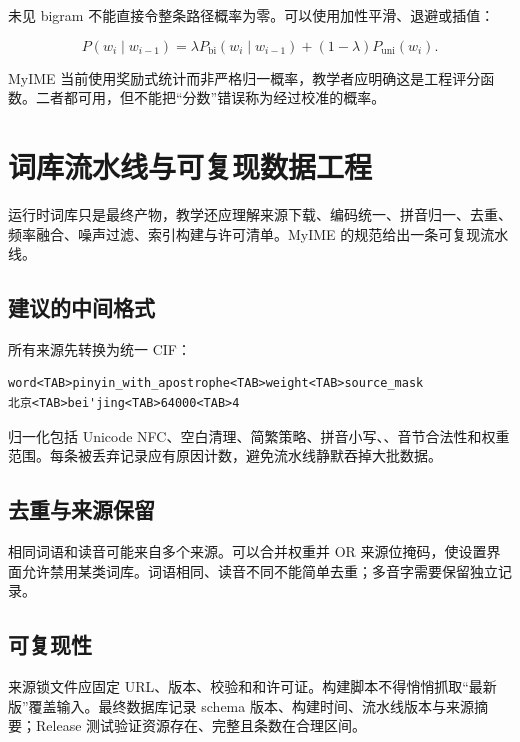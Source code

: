 未见 bigram 不能直接令整条路径概率为零。可以使用加性平滑、退避或插值：

\[
P(w_i\mid w_{i-1})=\lambda P_{\mathrm{bi}}(w_i\mid w_{i-1})+(1-\lambda)P_{\mathrm{uni}}(w_i).
\]

MyIME 当前使用奖励式统计而非严格归一概率，教学者应明确这是工程评分函数。二者都可用，但不能把“分数”错误称为经过校准的概率。


\chapter{词库流水线与可复现数据工程}

运行时词库只是最终产物，教学还应理解来源下载、编码统一、拼音归一、去重、频率融合、噪声过滤、索引构建与许可清单。MyIME 的规范给出一条可复现流水线。



\section{建议的中间格式}

所有来源先转换为统一 CIF：

\begin{lstlisting}[numbers=none]
word<TAB>pinyin_with_apostrophe<TAB>weight<TAB>source_mask
北京<TAB>bei'jing<TAB>64000<TAB>4
\end{lstlisting}

归一化包括 Unicode NFC、空白清理、简繁策略、拼音小写、、音节合法性和权重范围。每条被丢弃记录应有原因计数，避免流水线静默吞掉大批数据。

\section{去重与来源保留}

相同词语和读音可能来自多个来源。可以合并权重并 OR 来源位掩码，使设置界面允许禁用某类词库。词语相同、读音不同不能简单去重；多音字需要保留独立记录。

\section{可复现性}

来源锁文件应固定 URL、版本、校验和和许可证。构建脚本不得悄悄抓取“最新版”覆盖输入。最终数据库记录 schema 版本、构建时间、流水线版本与来源摘要；Release 测试验证资源存在、完整且条数在合理区间。

